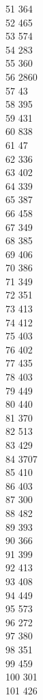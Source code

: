 { 51	364 \\
 52	465 \\
 53	574 \\
 54	283 \\
 55	360 \\
 56	2860 \\
 57	43 \\
 58	395 \\
 59	431 \\
 60	838 \\
 61	47 \\
 62	336 \\
 63	402 \\
 64	339 \\
 65	387 \\
 66	458 \\
 67	349 \\
 68	385 \\
 69	406 \\
 70	386 \\
 71	349 \\
 72	351 \\
 73	413 \\
 74	412 \\
 75	403 \\
 76	402 \\
 77	435 \\
 78	403 \\
 79	449 \\
 80	440 \\
 81	370 \\
 82	513 \\
 83	429 \\
 84	3707 \\
 85	410 \\
 86	403 \\
 87	300 \\
 88	482 \\
 89	393 \\
 90	366 \\
 91	399 \\
 92	413 \\
 93	408 \\
 94	449 \\
 95	573 \\
 96	272 \\
 97	380 \\
 98	351 \\
 99	459 \\
 100	301 \\
 101	426 \\
}
